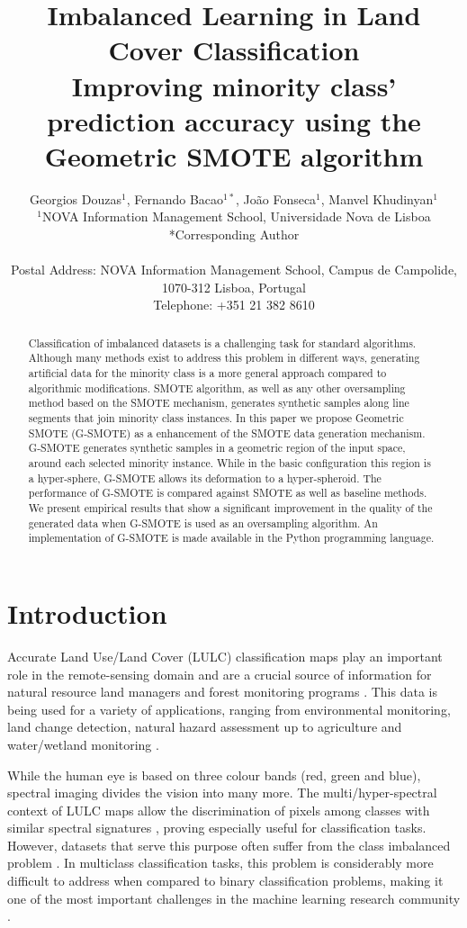 \documentclass[parskip=full]{scrartcl}
\title{Imbalanced Learning in Land Cover Classification  \\ \LARGE{Improving minority class' prediction accuracy using the Geometric SMOTE algorithm}}
\author{
	Georgios Douzas\(^{1}\), Fernando Bacao\(^{1*}\), João Fonseca\(^{1}\), Manvel Khudinyan\(^{1}\)
	\\
	\small{\(^{1}\)NOVA Information Management School, Universidade Nova de Lisboa}
	\\
	\small{*Corresponding Author}
	\\
	\\
	\small{Postal Address: NOVA Information Management School, Campus de Campolide, 1070-312 Lisboa, Portugal}
	\\
	\small{Telephone: +351 21 382 8610}
}
\date{}
\begin{document}
\maketitle

\begin{abstract}
Classification of imbalanced datasets is a challenging task for standard
algorithms. Although many methods exist to address this problem in different
ways, generating artificial data for the minority class is a more general
approach compared to algorithmic modifications. SMOTE algorithm, as well as any
other oversampling method based on the SMOTE mechanism, generates synthetic
samples along line segments that join minority class instances. In this paper we
propose Geometric SMOTE (G-SMOTE) as a enhancement of the SMOTE data generation
mechanism. G-SMOTE generates synthetic samples in a geometric region of the
input space, around each selected minority instance. While in the basic
configuration this region is a hyper-sphere, G-SMOTE allows its deformation to a
hyper-spheroid. The performance of G-SMOTE is compared against SMOTE as well as
baseline methods. We present empirical results that show a significant
improvement in the quality of the generated data when G-SMOTE is used as an
oversampling algorithm. An implementation of G-SMOTE is made available in the
Python programming language.
\end{abstract}

\section{Introduction}

Accurate Land Use/Land Cover (LULC) classification maps play an important role in the remote-sensing domain \cite{Cenggoro2018} and are a crucial source of information for natural resource land managers and forest monitoring programs \cite{Mellor2015}. This data is being used for a variety of applications, ranging from environmental monitoring, land change detection, natural hazard assessment up to agriculture and water/wetland monitoring \cite{Khatami2016}.

While the human eye is based on three colour bands (red, green and blue), spectral imaging divides the vision into many more. The multi/hyper-spectral context of LULC maps allow the discrimination of pixels among classes with similar spectral signatures \cite{Marconcini2009}, proving especially useful for classification tasks. However, datasets that serve this purpose often suffer from the class imbalanced problem \cite{Feng2019}. In multiclass classification tasks, this problem is considerably more difficult to address when compared to binary classification problems, making it one of the most important challenges in the machine learning research community \cite{Garcia2018}.
\end{document}
